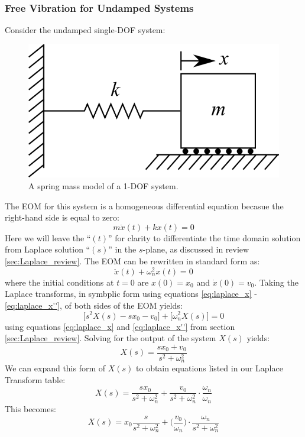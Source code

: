 \documentclass[12pt,letter]{article}
\numberwithin{ex}{section} %
\numberwithin{re}{section} %
\begin{document}
			\subsubsection{Free Vibration for Undamped Systems}
			Consider the undamped single-DOF system:
			\begin{figure}[H]
				\centering
				\includegraphics[]{../Figures/1-DOF-spring_mass_horizontal.png}
				\caption{A spring mass model of a 1-DOF system.}
			\end{figure}
			\noindent The EOM for this system is a homogeneous differential equation becasue the right-hand side is equal to zero:
			\begin{equation}
				m\ddot{x}(t) + kx(t) = 0 
			\end{equation}
			Here we will leave the ``$(t)$'' for clarity to differentiate the time domain solution from Laplace solution ``$(s)$'' in the $s$-plane, as discussed in review \ref{sec:Laplace_review}. The EOM can be rewritten in standard form as:
			\begin{equation}
				\ddot{x}(t) + \omega_n^2x(t) = 0 
			\end{equation}
			where the initial conditions at $t=0$ are $x(0)=x_0$ and $\dot{x}(0) = v_0$. Taking the Laplace transforms, in symbplic form using equations \ref{eq:laplace_x} - \ref{eq:laplace_x''}, of both sides of the EOM yields:
			\begin{equation}
				\big[s^2X(s) -sx_0 -v_0 \big] + \big[ \omega_n^2X(s) \big] =0
			\end{equation}
			using equations \ref{eq:laplace_x} and \ref{eq:laplace_x''} from section \ref{sec:Laplace_review}. Solving for the output of the system $X(s)$ yields:
			\begin{equation}
			X(s) = \frac{sx_0 + v_0}{s^2 + \omega_n^2}
			\end{equation}
			We can expand this form of $X(s)$ to obtain equations listed in our Laplace Transform table:
			\begin{equation}
			X(s) = \frac{sx_0}{s^2 + \omega_n^2} + \frac{v_0}{s^2 + \omega_n^2}\cdot \frac{\omega_n}{\omega_n}
			\end{equation}
			This becomes:
			\begin{equation}
			X(s) = x_0\frac{s}{s^2 + \omega_n^2} + \bigg(\frac{v_0}{\omega_n}\bigg) \cdot \frac{\omega_n}{s^2 + \omega_n^2}
			\end{equation}
			
\end{document}
